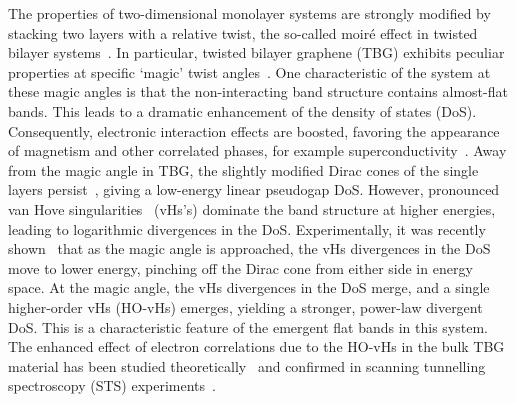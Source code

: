 The properties of two-dimensional monolayer systems are strongly modified by stacking two layers with a relative twist, the so-called moir\'e effect in twisted bilayer systems~\cite{LopesdosSantos2007PRL}. In particular, twisted bilayer graphene (TBG) exhibits peculiar properties at specific `magic' twist angles~\cite{Suarez2011,Bistritzer2011,Kim2017,Liu2019,Yuan2019,Song2019,Tarnopolsky2019,Cao2018,Caocorrelated2018,Lu2019}. One characteristic of the system at these magic angles is that the non-interacting band structure contains almost-flat bands. This leads to a dramatic enhancement of the density of states (DoS). Consequently, electronic interaction effects are boosted, favoring the appearance of magnetism and other correlated phases, for example superconductivity~\cite{Cao2018,Caocorrelated2018,Lu2019,Ojajarvi2018,Isobe2018,Wu2018,Peltonen2018,Kozii2019,Yankowitz2019,Hazra2019,Hu2019,Xie2020,Julku2020}. 
Away from the magic angle in TBG, the slightly modified Dirac cones of the single layers persist~\cite{LopesdosSantos2007PRL}, giving a low-energy linear pseudogap DoS. However, pronounced van Hove singularities~\cite{vanHove1953} (vHs's) dominate the band structure at higher energies, leading to logarithmic divergences in the DoS. Experimentally, it was recently shown~\cite{Li2010} that as the magic angle is approached, the vHs divergences in the DoS move to lower energy, pinching off the Dirac cone from either side in energy space. At the magic angle, the vHs divergences in the DoS merge, and a single higher-order vHs \cite{Yuan2019} (HO-vHs) emerges, yielding a stronger, power-law divergent DoS. This is a characteristic feature of the emergent flat bands in this system. The enhanced effect of electron correlations due to the HO-vHs in the bulk TBG material has been studied theoretically~\cite{Caocorrelated2018,Lu2019,Isobe2018,Classen2020PRB} and confirmed in scanning tunnelling spectroscopy (STS) experiments~\cite{Kerelsky2019,Choi2019}.

